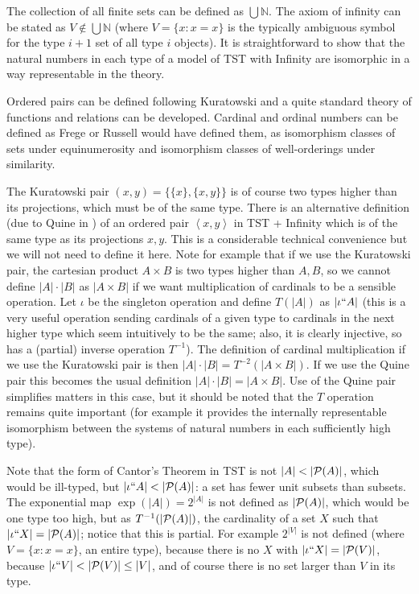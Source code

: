 \documentclass{article}
\theoremstyle{definition}
\theoremstyle{remark}
\begin{document}
The collection of all finite sets can be defined as $\bigcup \mathbb N$.  The axiom of infinity can be stated as $V \not\in \bigcup \mathbb N$ (where $V= \{x:x=x\}$ is the typically ambiguous symbol for the type $i+1$ set of all type $i$ objects).  It is straightforward to show that the natural numbers in each type of a model of TST with Infinity are isomorphic in a way representable in the theory.

Ordered pairs can be defined following Kuratowski and a quite standard theory of functions and relations can be developed.  Cardinal and ordinal numbers can be defined as Frege or Russell would have defined them, as isomorphism classes of sets under equinumerosity and isomorphism classes of well-orderings under similarity.

The Kuratowski pair $(x,y) = \{\{x\},\{x,y\}\}$ is of course two types higher than its projections, which must be of the same type.  There is an alternative definition (due to Quine in \cite{quinepair}) of an ordered pair
$\left< x,y\right>$ in TST + Infinity which is of the same type as its projections $x,y$.  This is a considerable technical convenience but we will not need to define it here.  Note for example that if we use the Kuratowski pair, the cartesian product $A \times B$ is two types higher than $A,B$, so we cannot define $|A| \cdot |B|$ as $|A \times B|$ if we want multiplication of cardinals to be a sensible operation.  Let $\iota$ be the singleton operation and define $T(|A|)$ as $|\iota``A|$ (this is a very useful operation sending cardinals of a given type to cardinals in the next higher type which seem intuitively to be the same; also, it is clearly injective, so has a (partial) inverse operation $T^{-1}$).  The definition of cardinal multiplication if we use the Kuratowski pair is then $|A| \cdot |B| =T^{-2}(|A\times B|)$.  If we use the Quine pair this becomes the usual definition $|A| \cdot |B| =|A\times B|$.  Use of the Quine pair simplifies matters in this case, but it should be noted that the $T$ operation remains quite important (for example it provides the internally representable isomorphism between the systems of natural numbers in each sufficiently high type).

Note that the form of Cantor's Theorem in TST is not $|A| < |{\cal P}(A)|$, which would be ill-typed, but $|\iota``A|<|{\cal P}(A)|$:  a set has fewer unit subsets than subsets.  The exponential map $\exp(|A|) = 2^{|A|}$ is not defined as $|{\cal P}(A)|$, which would be one type too high, but as $T^{-1}(|{\cal P}(A)|)$, the cardinality of a set $X$ such that $|\iota``X| = |{\cal P}(A)|$;   notice that this is partial.  For example
$2^{|V|}$ is not defined (where $V=\{x:x=x\}$, an entire type), because there is no $X$ with $|\iota``X|=|{\cal P}(V)|$, because $|\iota``V|<|{\cal P}(V)| \leq |V|$, and of course there is no set larger than $V$ in its type.
\end{document}
